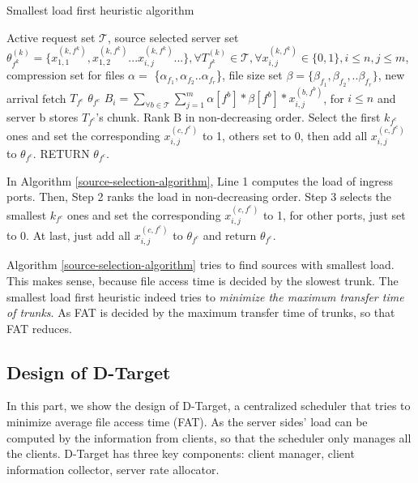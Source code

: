 \documentclass{IEEEtran}
\begin{document}
\begin{algorithm} 
 \caption{Smallest load  first heuristic algorithm}
 \begin{algorithmic}[1]\label{source-selection-algorithm}
 \renewcommand{\algorithmicrequire}{\textbf{Input: }}
 \renewcommand{\algorithmicensure}{\textbf{Output:}}
 \REQUIRE Active request set $\mathcal{T}$, source selected server set $\theta_{f^k}^{(k)}=\{x_{1,1} ^{(k,f^k)},x_{1,2} ^{(k,f^k)}...x_{i,j}^{(k,f^k)}...\} ,\forall T^{(k)}_{f^k} \in \mathcal{T},\forall x_{i,j}^{(k,f^k)} \in \{0,1\},i \le n,j \le m$,  compression set for files $\alpha=$ \{$\alpha_{f_1},\alpha_{f_2}..\alpha_{f_r}$\}, file size set $\beta=\{\beta_{f_1},\beta_{f_2},..\beta_{f_r}\}$, new arrival fetch  $T_{f^c}$
\ENSURE   $\theta_{f^c}$
\STATE $B_i= \sum_{\forall b \in \mathcal{T}}\sum_{j=1}^{m}\alpha[f^b]*\beta[f^b]*x_{i,j}^{(b,f^b)}$, for $i \le n$ and server b stores $T_{f^c}$'s chunk.
\STATE  Rank B in non-decreasing order.
\STATE  Select the first $k_{f^c}$ ones and set the corresponding $x_{i,j}^{(c,f^c)}$ to 1, others set to 0, then add all  $x_{i,j}^{(c,f^c)}$ to $\theta_{f^c}$.
\STATE  RETURN $\theta_{f^c}$.
\end{algorithmic} 
\end{algorithm}


In Algorithm \ref{source-selection-algorithm}, Line 1 computes the load of ingress ports.
Then, Step 2 ranks the load in non-decreasing order.
Step 3 selects the smallest $k_{f^c}$ ones and set the corresponding $x_{i,j}^{(c,f^c)}$ to 1,
for other ports, just set to 0. At last, just add all  $x_{i,j}^{(c,f^c)}$ to $\theta_{f^c}$ and return $\theta_{f^c}$.


 Algorithm \ref{source-selection-algorithm} tries to find sources with smallest load.
 This makes sense, because file access time is decided by the slowest trunk.
 The smallest load first heuristic indeed tries to {\em minimize the maximum transfer time of trunks}.
 As FAT is decided by the maximum transfer time of trunks, so that FAT reduces.

\subsection{Design of D-Target}
In this part, we show the design of D-Target, 
a centralized scheduler that tries to minimize average file access time (FAT).
As the server sides' load can be computed by the information from clients,
so that the scheduler only manages all the clients.
D-Target has three key components: client manager, client information collector, server rate allocator.
\end{document}
